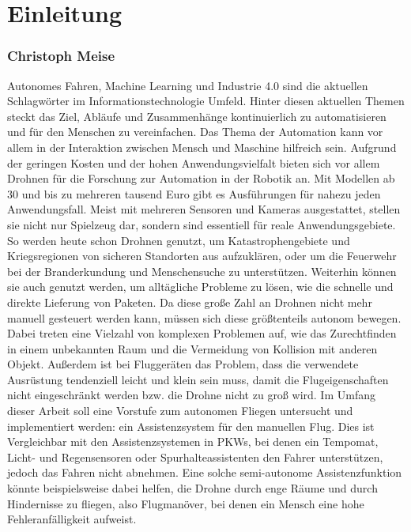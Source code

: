

\pagestyle{plain}
\chapter{Einleitung}
\label{cha:Introduction}
\subsection*{Christoph Meise}
Autonomes Fahren, Machine Learning und Industrie 4.0 sind die aktuellen Schlagwörter im Informationstechnologie Umfeld. Hinter diesen aktuellen Themen steckt das Ziel, Abläufe und Zusammenhänge kontinuierlich zu automatisieren und für den Menschen zu vereinfachen. Das Thema der Automation kann vor allem in der Interaktion zwischen Mensch und Maschine hilfreich sein. Aufgrund der geringen Kosten und der hohen Anwendungsvielfalt bieten sich vor allem Drohnen für die Forschung zur Automation in der Robotik an. \newline
Mit Modellen ab 30 und bis zu mehreren tausend Euro gibt es Ausführungen für nahezu jeden Anwendungsfall. Meist mit mehreren Sensoren und Kameras ausgestattet, stellen sie nicht nur Spielzeug dar, sondern sind essentiell für reale Anwendungsgebiete. \newline
So werden heute schon Drohnen genutzt, um Katastrophengebiete und Kriegsregionen von sicheren Standorten aus aufzuklären, oder um die Feuerwehr bei der Branderkundung und Menschensuche zu unterstützen. \newline
Weiterhin können sie auch genutzt werden, um alltägliche Probleme zu lösen, wie die schnelle und direkte Lieferung von Paketen. \newline
Da diese große Zahl an Drohnen nicht mehr manuell gesteuert werden kann, müssen sich diese größtenteils autonom bewegen. Dabei treten eine Vielzahl von komplexen Problemen auf, wie das Zurechtfinden in einem unbekannten Raum und die Vermeidung von Kollision mit anderen Objekt. \newline
Außerdem ist bei Fluggeräten das Problem, dass die verwendete Ausrüstung tendenziell leicht und klein sein muss, damit die Flugeigenschaften nicht eingeschränkt werden bzw. die Drohne nicht zu groß wird. \newline
Im Umfang dieser Arbeit soll eine Vorstufe zum autonomen Fliegen untersucht und implementiert werden: ein Assistenzsystem für den manuellen Flug. Dies ist Vergleichbar mit den Assistenzsystemen in PKWs, bei denen ein Tempomat, Licht- und Regensensoren oder Spurhalteassistenten den Fahrer unterstützen, jedoch das Fahren nicht abnehmen. \newline
Eine solche semi-autonome Assistenzfunktion könnte beispielsweise dabei helfen, die Drohne durch enge Räume und durch Hindernisse zu fliegen, also Flugmanöver, bei denen ein Mensch eine hohe Fehleranfälligkeit aufweist. \newline



